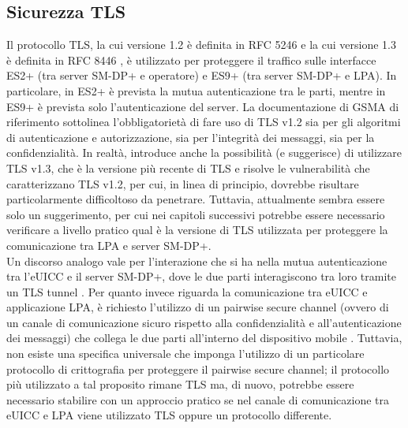 \documentclass[10pt, twoside, openany]{book}
\begin{document}
\subsection{Sicurezza TLS}
Il protocollo TLS, la cui versione 1.2 è definita in RFC 5246 \cite{RFC-5246} e la cui versione 1.3 è definita in RFC 8446 \cite{RFC-8446}, è utilizzato per proteggere il traffico sulle interfacce ES2+ (tra server SM-DP+ e operatore) e ES9+ (tra server SM-DP+ e LPA). In particolare, in ES2+ è prevista la mutua autenticazione tra le parti, mentre in ES9+ è prevista solo l'autenticazione del server. La documentazione di GSMA di riferimento \cite{GSMA-docs-new} sottolinea l'obbligatorietà di fare uso di TLS v1.2 sia per gli algoritmi di autenticazione e autorizzazione, sia per l'integrità dei messaggi, sia per la confidenzialità. In realtà, introduce anche la possibilità (e suggerisce) di utilizzare TLS v1.3, che è la versione più recente di TLS e risolve le vulnerabilità che caratterizzano TLS v1.2, per cui, in linea di principio, dovrebbe risultare particolarmente difficoltoso da penetrare. Tuttavia, attualmente sembra essere solo un suggerimento, per cui nei capitoli successivi potrebbe essere necessario verificare a livello pratico qual è la versione di TLS utilizzata per proteggere la comunicazione tra LPA e server SM-DP+.\\
Un discorso analogo vale per l'interazione che si ha nella mutua autenticazione tra l'eUICC e il server SM-DP+, dove le due parti interagiscono tra loro tramite un TLS tunnel \cite{Sec-analysis}. Per quanto invece riguarda la comunicazione tra eUICC e applicazione LPA, è richiesto l'utilizzo di un pairwise secure channel (ovvero di un canale di comunicazione sicuro rispetto alla confidenzialità e all'autenticazione dei messaggi) che collega le due parti all'interno del dispositivo mobile \cite{Sec-analysis}. Tuttavia, non esiste una specifica universale che imponga l'utilizzo di un particolare protocollo di crittografia per proteggere il pairwise secure channel; il protocollo più utilizzato a tal proposito rimane TLS ma, di nuovo, potrebbe essere necessario stabilire con un approccio pratico se nel canale di comunicazione tra eUICC e LPA viene utilizzato TLS oppure un protocollo differente.
\end{document}
